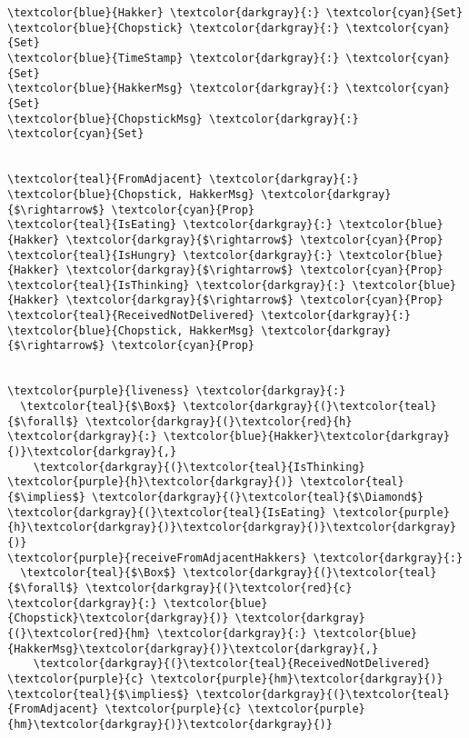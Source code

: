 \begin{Verbatim}[commandchars=\\\{\},codes={\catcode`$=3},fontsize=\small]
\textcolor{blue}{Hakker} \textcolor{darkgray}{:} \textcolor{cyan}{Set}
\textcolor{blue}{Chopstick} \textcolor{darkgray}{:} \textcolor{cyan}{Set}
\textcolor{blue}{TimeStamp} \textcolor{darkgray}{:} \textcolor{cyan}{Set}
\textcolor{blue}{HakkerMsg} \textcolor{darkgray}{:} \textcolor{cyan}{Set}
\textcolor{blue}{ChopstickMsg} \textcolor{darkgray}{:} \textcolor{cyan}{Set}


\textcolor{teal}{FromAdjacent} \textcolor{darkgray}{:} \textcolor{blue}{Chopstick, HakkerMsg} \textcolor{darkgray}{$\rightarrow$} \textcolor{cyan}{Prop}
\textcolor{teal}{IsEating} \textcolor{darkgray}{:} \textcolor{blue}{Hakker} \textcolor{darkgray}{$\rightarrow$} \textcolor{cyan}{Prop}
\textcolor{teal}{IsHungry} \textcolor{darkgray}{:} \textcolor{blue}{Hakker} \textcolor{darkgray}{$\rightarrow$} \textcolor{cyan}{Prop}
\textcolor{teal}{IsThinking} \textcolor{darkgray}{:} \textcolor{blue}{Hakker} \textcolor{darkgray}{$\rightarrow$} \textcolor{cyan}{Prop}
\textcolor{teal}{ReceivedNotDelivered} \textcolor{darkgray}{:} \textcolor{blue}{Chopstick, HakkerMsg} \textcolor{darkgray}{$\rightarrow$} \textcolor{cyan}{Prop}


\textcolor{purple}{liveness} \textcolor{darkgray}{:} 
  \textcolor{teal}{$\Box$} \textcolor{darkgray}{(}\textcolor{teal}{$\forall$} \textcolor{darkgray}{(}\textcolor{red}{h} \textcolor{darkgray}{:} \textcolor{blue}{Hakker}\textcolor{darkgray}{)}\textcolor{darkgray}{,} 
    \textcolor{darkgray}{(}\textcolor{teal}{IsThinking} \textcolor{purple}{h}\textcolor{darkgray}{)} \textcolor{teal}{$\implies$} \textcolor{darkgray}{(}\textcolor{teal}{$\Diamond$} \textcolor{darkgray}{(}\textcolor{teal}{IsEating} \textcolor{purple}{h}\textcolor{darkgray}{)}\textcolor{darkgray}{)}\textcolor{darkgray}{)}
\textcolor{purple}{receiveFromAdjacentHakkers} \textcolor{darkgray}{:} 
  \textcolor{teal}{$\Box$} \textcolor{darkgray}{(}\textcolor{teal}{$\forall$} \textcolor{darkgray}{(}\textcolor{red}{c} \textcolor{darkgray}{:} \textcolor{blue}{Chopstick}\textcolor{darkgray}{)} \textcolor{darkgray}{(}\textcolor{red}{hm} \textcolor{darkgray}{:} \textcolor{blue}{HakkerMsg}\textcolor{darkgray}{)}\textcolor{darkgray}{,} 
    \textcolor{darkgray}{(}\textcolor{teal}{ReceivedNotDelivered} \textcolor{purple}{c} \textcolor{purple}{hm}\textcolor{darkgray}{)} \textcolor{teal}{$\implies$} \textcolor{darkgray}{(}\textcolor{teal}{FromAdjacent} \textcolor{purple}{c} \textcolor{purple}{hm}\textcolor{darkgray}{)}\textcolor{darkgray}{)}
\end{Verbatim}
